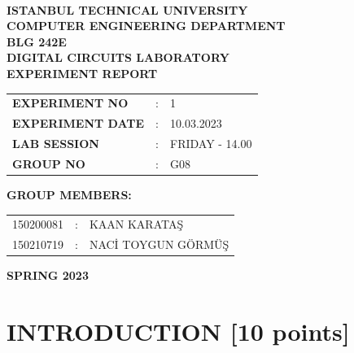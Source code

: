 \documentclass[pdftex,12pt,a4paper]{article}
\begin{document}
\begin{titlepage}
\begin{center}
\textbf{}\\
\textbf{\Large{ISTANBUL TECHNICAL UNIVERSITY}}\\
\vspace{0.5cm}
\textbf{\Large{COMPUTER ENGINEERING DEPARTMENT}}\\
\vspace{2cm}
\textbf{\Large{BLG 242E\\ DIGITAL CIRCUITS LABORATORY\\ EXPERIMENT REPORT}}\\
\vspace{2.8cm}
\begin{table}[ht]
\centering
\Large{
\begin{tabular}{lcl}
\textbf{EXPERIMENT NO}  & : & 1 \\
\textbf{EXPERIMENT DATE}  & : & 10.03.2023 \\
\textbf{LAB SESSION}  & : & FRIDAY - 14.00 \\
\textbf{GROUP NO}  & : & G08 \\
\end{tabular}}
\end{table}
\vspace{1cm}
\textbf{\Large{GROUP MEMBERS:}}\\
\begin{table}[ht]
\centering
\Large{
\begin{tabular}{rcl}
150200081  & : & KAAN KARATAŞ \\
150210719   & : & NACİ TOYGUN GÖRMÜŞ \\
\end{tabular}}
\end{table}
\vspace{2.8cm}
\textbf{\Large{SPRING 2023}}

\end{center}

\end{titlepage}

\thispagestyle{empty}
\setcounter{tocdepth}{4}
\tableofcontents
\clearpage

\setcounter{page}{1}

\section{INTRODUCTION [10 points]}
\end{document}
